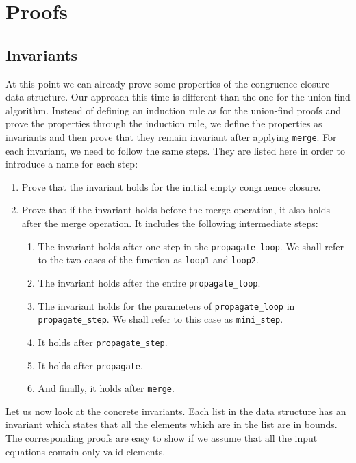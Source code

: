 \section{Proofs}

\subsection{Invariants}

At this point we can already prove some properties of the congruence closure data structure. Our approach this time is different than the one for the union-find algorithm. Instead of defining an induction rule as for the union-find proofs and prove the properties through the induction rule, we define the properties as invariants and then prove that they remain invariant after applying \lstinline|merge|. For each invariant, we need to follow the same steps. They are listed here in order to introduce a name for each step:

\begin{enumerate}
	\item Prove that the invariant holds for the initial empty congruence closure.

	\item Prove that if the invariant holds before the merge operation, it also holds after the merge operation. It includes the following intermediate steps:
    \begin{enumerate}
        \item The invariant holds after one step in the \lstinline{propagate_loop}. We shall refer to the two cases of the function as \lstinline{loop1} and \lstinline{loop2}.
    	\item The invariant holds after the entire \lstinline{propagate_loop}.
    	\item The invariant holds for the parameters of \lstinline{propagate_loop} in \lstinline{propagate_step}. We shall refer to this case as \lstinline{mini_step}.
    	\item It holds after \lstinline{propagate_step}.
    	\item It holds after \lstinline{propagate}.
    	\item And finally, it holds after \lstinline{merge}.
    \end{enumerate}
\end{enumerate}

Let us now look at the concrete invariants. Each list in the data structure has an invariant which states that all the elements which are in the list are in bounds. The corresponding proofs are easy to show if we assume that all the input equations contain only valid elements.

